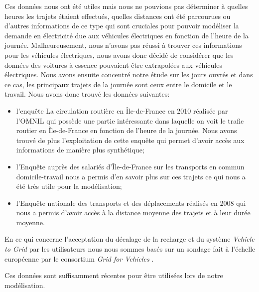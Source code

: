 Ces données nous ont été utiles mais nous ne pouvions pas déterminer à quelles heures les trajets étaient effectués, quelles distances ont été parcourues ou d'autres informations de ce type qui sont cruciales pour pouvoir modéliser la demande en électricité due aux véhicules électriques en fonction de l'heure de la journée. Malheureusement, nous n'avons pas réussi à trouver ces informations pour les véhicules électriques, nous avons donc décidé de considérer que les données des voitures à essence pouvaient être extrapolées aux véhicules électriques. Nous avons ensuite concentré notre étude sur les jours ouvrés et dans ce cas, les principaux trajets de la journée sont ceux entre le domicile et le travail. Nous avons donc trouvé les données suivantes:
\begin{itemize}
	\item l'enquête \og{}La circulation routière en Île-de-France en 2010\fg{} \cite{OMNIL} réalisée par l'OMNIL qui possède une partie intéressante dans laquelle on voit le trafic routier en Île-de-France en fonction de l'heure de la journée. Nous avons trouvé de plus l'exploitation de cette enquête qui permet d'avoir accès aux informations de manière plus synthétique;
	\item l'\og{}Enquête auprès des salariés d'Île-de-France sur les transports en commun domicile-travail\fg{} \cite{ORSTIF} nous a permis d'en savoir plus sur ces trajets ce qui nous a  été très utile pour la modélisation;
	\item l'\og{}Enquête nationale des transports et des déplacements réalisés en 2008\fg{} \cite{enqueteGouv} qui nous a permis d'avoir accès à la distance moyenne des trajets et à leur durée moyenne.
\end{itemize}
\bigskip
En ce qui concerne l'acceptation du décalage de la recharge et du système \emph{Vehicle to Grid} par les utilisateurs nous nous sommes basés sur un sondage fait à l'échelle européenne par le consortium \emph{Grid for Vehicles} \cite{reacUtilisateurs}.

Ces données sont suffisamment récentes pour être utilisées lors de notre modélisation.